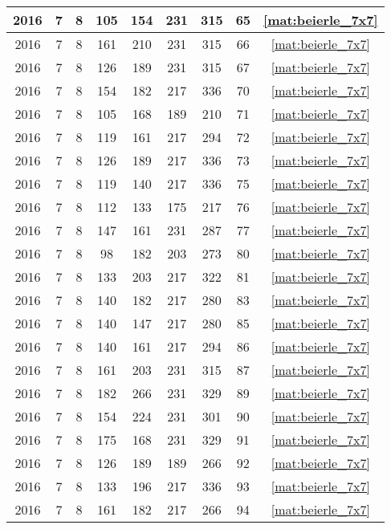 \begin{longtable}{|c|c|c|c|c|c|c|c|c|}
2016 & 7 & 8 & 105 & 154 & 231 & 315 & 65 & \eqref{mat:beierle_7x7} \\ \hline 
2016 & 7 & 8 & 161 & 210 & 231 & 315 & 66 & \eqref{mat:beierle_7x7} \\ \hline 
2016 & 7 & 8 & 126 & 189 & 231 & 315 & 67 & \eqref{mat:beierle_7x7} \\ \hline 
2016 & 7 & 8 & 154 & 182 & 217 & 336 & 70 & \eqref{mat:beierle_7x7} \\ \hline 
2016 & 7 & 8 & 105 & 168 & 189 & 210 & 71 & \eqref{mat:beierle_7x7} \\ \hline 
2016 & 7 & 8 & 119 & 161 & 217 & 294 & 72 & \eqref{mat:beierle_7x7} \\ \hline 
2016 & 7 & 8 & 126 & 189 & 217 & 336 & 73 & \eqref{mat:beierle_7x7} \\ \hline 
2016 & 7 & 8 & 119 & 140 & 217 & 336 & 75 & \eqref{mat:beierle_7x7} \\ \hline 
2016 & 7 & 8 & 112 & 133 & 175 & 217 & 76 & \eqref{mat:beierle_7x7} \\ \hline 
2016 & 7 & 8 & 147 & 161 & 231 & 287 & 77 & \eqref{mat:beierle_7x7} \\ \hline 
2016 & 7 & 8 & 98 & 182 & 203 & 273 & 80 & \eqref{mat:beierle_7x7} \\ \hline 
2016 & 7 & 8 & 133 & 203 & 217 & 322 & 81 & \eqref{mat:beierle_7x7} \\ \hline 
2016 & 7 & 8 & 140 & 182 & 217 & 280 & 83 & \eqref{mat:beierle_7x7} \\ \hline 
2016 & 7 & 8 & 140 & 147 & 217 & 280 & 85 & \eqref{mat:beierle_7x7} \\ \hline 
2016 & 7 & 8 & 140 & 161 & 217 & 294 & 86 & \eqref{mat:beierle_7x7} \\ \hline 
2016 & 7 & 8 & 161 & 203 & 231 & 315 & 87 & \eqref{mat:beierle_7x7} \\ \hline 
2016 & 7 & 8 & 182 & 266 & 231 & 329 & 89 & \eqref{mat:beierle_7x7} \\ \hline 
2016 & 7 & 8 & 154 & 224 & 231 & 301 & 90 & \eqref{mat:beierle_7x7} \\ \hline 
2016 & 7 & 8 & 175 & 168 & 231 & 329 & 91 & \eqref{mat:beierle_7x7} \\ \hline 
2016 & 7 & 8 & 126 & 189 & 189 & 266 & 92 & \eqref{mat:beierle_7x7} \\ \hline 
2016 & 7 & 8 & 133 & 196 & 217 & 336 & 93 & \eqref{mat:beierle_7x7} \\ \hline 
2016 & 7 & 8 & 161 & 182 & 217 & 266 & 94 & \eqref{mat:beierle_7x7} \\ \hline 

\end{longtable}
